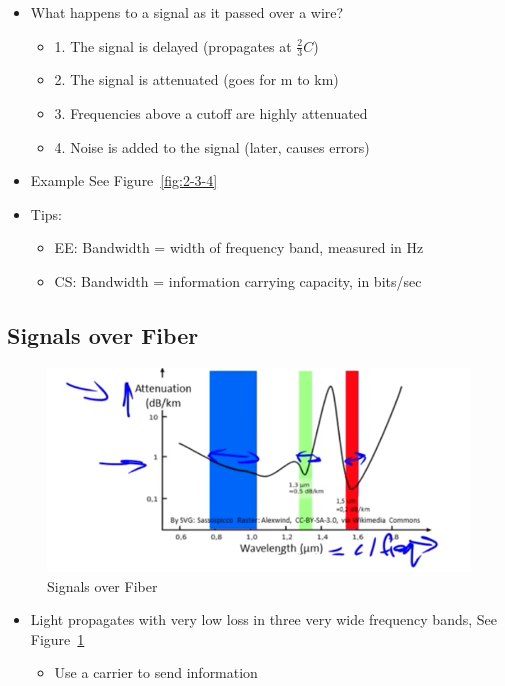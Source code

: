 \documentclass[12pt]{ctexart}   %
\begin{document}
	 \begin{itemize}
	 	\item What happens to a signal as it passed over a wire?
	 	\begin{itemize}
	 		\item {\color{blue} 1.} The signal is delayed (propagates at $\frac{2}{3} C$)
	 		\item {\color{blue} 2.} The signal is attenuated (goes for m to km)
	 		\item {\color{blue} 3.} Frequencies above a cutoff are highly attenuated
	 		\item {\color{blue} 4.} Noise is added to the signal (later, causes errors)
	 	\end{itemize}
	 	
	 	\item Example See Figure~\ref{fig:2-3-4}
	 	
	 	\item Tips:
	 	\begin{itemize}
	 		\item EE: Bandwidth = width of frequency band, measured in Hz
	 		\item CS: Bandwidth = information carrying capacity, in bits/sec
	 	\end{itemize}
	 \end{itemize}
	 
	 \subsection{Signals over Fiber}
	 
	 \begin{figure}[h!] %
	 \centering
	 \includegraphics[scale=0.7]{images/2-3-5}
	\caption{ Signals over Fiber}
	 \label{fig:2-3-5}
	 \end{figure}
	 
	 \begin{itemize}
	 	\item Light propagates with very low loss in three very wide frequency bands, See Figure~\ref{fig:2-3-5}
	 	\begin{itemize}
	 		\item Use a carrier to send information
	 	\end{itemize}
	 \end{itemize}
	 
\end{document}
